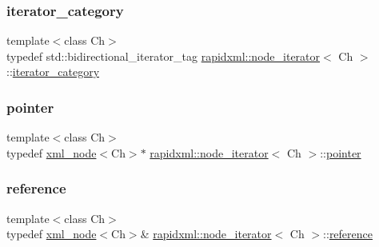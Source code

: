\subsubsection{\texorpdfstring{iterator\_category}{iterator\_category}}
{\footnotesize\ttfamily template$<$class Ch$>$ \\
typedef std\+::bidirectional\+\_\+iterator\+\_\+tag \mbox{\hyperlink{classrapidxml_1_1node__iterator}{rapidxml\+::node\+\_\+iterator}}$<$ Ch $>$\+::\mbox{\hyperlink{classrapidxml_1_1node__iterator_a8e82d75f768e17bf7349d010ee26c037}{iterator\+\_\+category}}}

\mbox{\label{classrapidxml_1_1node__iterator_a65dca8bca2b9c29f635b9ad0bdeeecb9}} 
\subsubsection{\texorpdfstring{pointer}{pointer}}
{\footnotesize\ttfamily template$<$class Ch$>$ \\
typedef \mbox{\hyperlink{classrapidxml_1_1xml__node}{xml\+\_\+node}}$<$Ch$>$$\ast$ \mbox{\hyperlink{classrapidxml_1_1node__iterator}{rapidxml\+::node\+\_\+iterator}}$<$ Ch $>$\+::\mbox{\hyperlink{classrapidxml_1_1node__iterator_a65dca8bca2b9c29f635b9ad0bdeeecb9}{pointer}}}

\mbox{\label{classrapidxml_1_1node__iterator_ad7fabbcb7d3d9e4e220299c5475b9e9c}} 
\subsubsection{\texorpdfstring{reference}{reference}}
{\footnotesize\ttfamily template$<$class Ch$>$ \\
typedef \mbox{\hyperlink{classrapidxml_1_1xml__node}{xml\+\_\+node}}$<$Ch$>$\& \mbox{\hyperlink{classrapidxml_1_1node__iterator}{rapidxml\+::node\+\_\+iterator}}$<$ Ch $>$\+::\mbox{\hyperlink{classrapidxml_1_1node__iterator_ad7fabbcb7d3d9e4e220299c5475b9e9c}{reference}}}

\mbox{\label{classrapidxml_1_1node__iterator_ade6310119ed1f72c94830e006fac69b7}} 
